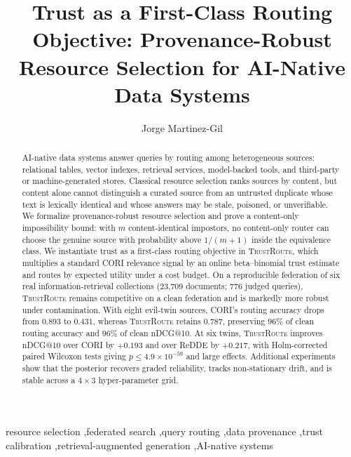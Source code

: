 \documentclass[preprint,12pt]{elsarticle}
\newcommand{\system}{\textsc{TrustRoute}}
\begin{document}
\begin{frontmatter}

\title{Trust as a First-Class Routing Objective: Provenance-Robust Resource
Selection for AI-Native Data Systems}

\author[scch]{Jorge Martinez-Gil}

\begin{abstract}
AI-native data systems answer queries by routing among heterogeneous sources:
relational tables, vector indexes, retrieval services, model-backed tools, and
third-party or machine-generated stores. Classical resource selection ranks
sources by content, but content alone cannot distinguish a curated source from an
untrusted duplicate whose text is lexically identical and whose answers may be
stale, poisoned, or unverifiable. We formalize provenance-robust resource
selection and prove a content-only impossibility bound: with $m$
content-identical impostors, no content-only router can choose the genuine source
with probability above $1/(m+1)$ inside the equivalence class. We instantiate
trust as a first-class routing objective in \system, which multiplies a standard
CORI relevance signal by an online beta--binomial trust estimate and routes by
expected utility under a cost budget. On a reproducible federation of six real
information-retrieval collections (23{,}709 documents; 776 judged queries),
\system{} remains competitive on a clean federation and is markedly more robust
under contamination. With eight evil-twin sources, CORI's routing accuracy drops
from $0.893$ to $0.431$, whereas \system{} retains $0.787$, preserving $96\%$ of
clean routing accuracy and $96\%$ of clean nDCG@10. At six twins, \system{}
improves nDCG@10 over CORI by $+0.193$ and over ReDDE by $+0.217$, with
Holm-corrected paired Wilcoxon tests giving $p\le 4.9\times10^{-59}$ and large
effects. Additional experiments show that the posterior recovers graded
reliability, tracks non-stationary drift, and is stable across a $4\times3$
hyper-parameter grid.
\end{abstract}

\begin{keyword}
resource selection \sep federated search \sep query routing \sep data provenance
\sep trust calibration \sep retrieval-augmented generation \sep AI-native systems
\end{keyword}

\end{frontmatter}
\end{document}
